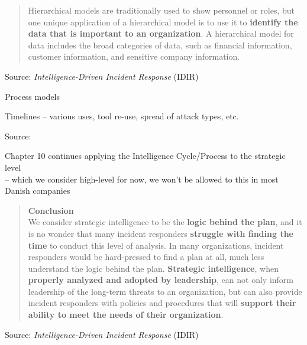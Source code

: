 \documentclass[Screen16to9,17pt]{foils}
\begin{document}


\begin{quote}
Hierarchical models are traditionally used to show personnel or roles, but one unique application of a hierarchical model is to use it to {\bf identify the data that is important to an organization}. A hierarchical model for data includes the broad categories of data, such as financial information, customer information, and sensitive company information.
\end{quote}
Source: \emph{Intelligence-Driven Incident Response} (IDIR)




\begin{list2}
\item Process models
\item Timelines -- various uses, tool re-use, spread of attack types, etc.
\end{list2}


Source: 

\begin{list2}
\item Chapter 10 continues applying the Intelligence Cycle/Process to the strategic level \\
-- which we consider high-level for now, we won't be allowed to this in most Danish companies
\end{list2}



\begin{quote}
{\Large\bf Conclusion}\\
We consider strategic intelligence to be the {\bf logic behind the plan}, and it is no wonder that many incident responders {\bf struggle with finding the time} to conduct this level of analysis. In many organizations, incident responders would be hard-pressed to find a plan at all, much less understand the logic behind the plan. {\bf Strategic intelligence}, when {\bf properly analyzed and adopted by leadership}, can not only inform leadership of the long-term threats to an organization, but can also provide incident responders with policies and procedures that will {\bf support their ability to meet the needs of their organization}.
\end{quote}
Source: \emph{Intelligence-Driven Incident Response} (IDIR)
\end{document}
